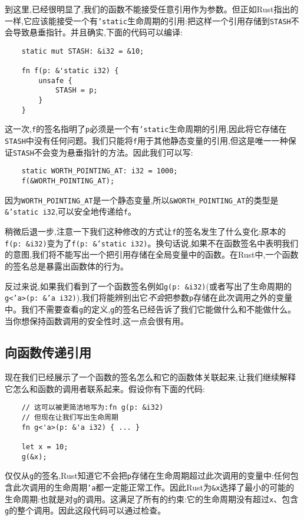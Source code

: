 到这里,已经很明显了,我们的函数不能接受任意引用作为参数。但正如Rust指出的一样,它应该能接受一个有\texttt{'static}生命周期的引用:把这样一个引用存储到\texttt{STASH}不会导致悬垂指针。并且确实,下面的代码可以编译:
\begin{verbatim}
    static mut STASH: &i32 = &10;

    fn f(p: &'static i32) {
        unsafe {
            STASH = p;
        }
    }
\end{verbatim}

这一次,\texttt{f}的签名指明了\texttt{p}必须是一个有\texttt{'static}生命周期的引用,因此将它存储在\texttt{STASH}中没有任何问题。我们只能将\texttt{f}用于其他静态变量的引用,但这是唯一一种保证\texttt{STASH}不会变为悬垂指针的方法。因此我们可以写:
\begin{verbatim}
    static WORTH_POINTING_AT: i32 = 1000;
    f(&WORTH_POINTING_AT);
\end{verbatim}

因为\texttt{WORTH\_POINTING\_AT}是一个静态变量,所以\texttt{\&WORTH\_POINTING\_AT}的类型是\texttt{\&'static i32},可以安全地传递给\texttt{f}。

稍微后退一步,注意一下我们这种修改的方式让\texttt{f}的签名发生了什么变化:原本的\texttt{f(p: \&i32)}变为了\texttt{f(p: \&'static i32)}。换句话说,如果不在函数签名中表明我们的意图,我们将不能写出一个把引用存储在全局变量中的函数。在Rust中,一个函数的签名总是暴露出函数体的行为。

反过来说,如果我们看到了一个函数签名例如\texttt{g(p: \&i32)}(或者写出了生命周期的\texttt{g<'a>(p: \&'a i32)}),我们将能辨别出它\emph{不会}把参数\texttt{p}存储在此次调用之外的变量中。我们不需要查看\texttt{g}的定义,\texttt{g}的签名已经告诉了我们它能做什么和不能做什么。当你想保持函数调用的安全性时,这一点会很有用。

\subsection{向函数传递引用}
现在我们已经展示了一个函数的签名怎么和它的函数体关联起来,让我们继续解释它怎么和函数的调用者联系起来。假设你有下面的代码:
\begin{verbatim}
    // 这可以被更简洁地写为:fn g(p: &i32)
    // 但现在让我们写出生命周期
    fn g<'a>(p: &'a i32) { ... }

    let x = 10;
    g(&x);
\end{verbatim}

仅仅从\texttt{g}的签名,Rust知道它不会把\texttt{p}存储在生命周期超过此次调用的变量中:任何包含此次调用的生命周期\texttt{'a}都一定能正常工作。因此Rust为\texttt{\&x}选择了最小的可能的生命周期:也就是对\texttt{g}的调用。这满足了所有的约束:它的生命周期没有超过\texttt{x}、包含\texttt{g}的整个调用。因此这段代码可以通过检查。

